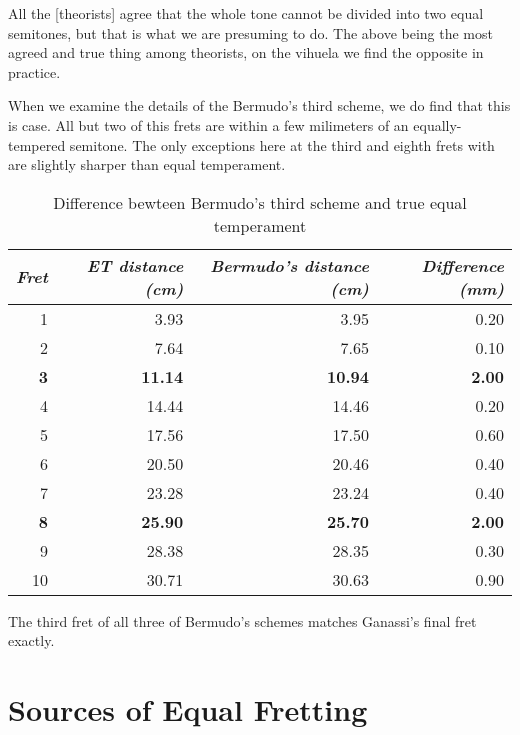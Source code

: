 \begin{blocks}
All the [theorists] agree that the whole tone cannot be divided into two equal semitones, but
that is what we are presuming to do.  The above being the most agreed and true thing among
theorists, on the vihuela we find the opposite in practice. \autocite[xx]{DE:1}
\end{blocks}

When we examine the details of the Bermudo's third scheme, we do find that this is case. All
but two of this frets are within a few milimeters of an equally-tempered semitone. The only
exceptions here at the third and eighth frets with are slightly sharper than equal temperament.

\begin{table}[h!]
    \begin{center}
    \begin{tabular}{ r r r r }
      \textit{Fret} & \textit{ET distance (cm)} & \textit{Bermudo's distance (cm)} & \textit{Difference (mm)} \\
      \hline
      1  & 3.93	  & 3.95	& 0.20 \\
      2  & 7.64	  & 7.65	& 0.10 \\
      \textbf{3}  & \textbf{11.14}	& \textbf{10.94}	& \textbf{2.00} \\
      4  & 14.44	& 14.46	& 0.20 \\
      5  & 17.56	& 17.50	& 0.60 \\
      6  & 20.50	& 20.46	& 0.40 \\
      7  & 23.28	& 23.24	& 0.40 \\
      \textbf{8}  & \textbf{25.90}	& \textbf{25.70}	& \textbf{2.00} \\
      9  & 28.38	& 28.35	& 0.30 \\
      10 & 30.71	& 30.63	& 0.90 \\
    \end{tabular}
    \end{center}
    \caption{Difference bewteen Bermudo's third scheme and true equal temperament}
\end{table}



The third fret of all three of Bermudo's schemes matches Ganassi's final fret exactly.




\section{Sources of Equal Fretting}

